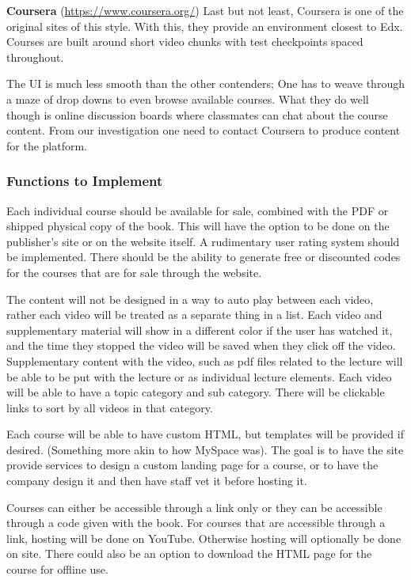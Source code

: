 \documentclass{article}
\begin{document}
\textbf{Coursera} (\url{https://www.coursera.org/})
Last but not least, Coursera is one of the original sites of this style. With
this, they provide an environment closest to Edx. Courses are built around short
video chunks with test checkpoints spaced throughout.

The UI is much less smooth than the other contenders; One has to weave through
a maze of drop downs to even browse available courses. What they do well though
is online discussion boards where classmates can chat about the course content.
From our investigation one need to contact Coursera to produce content for the
platform. \vspace{\baselineskip}

\subsubsection{Functions to Implement}

Each individual course should be available for sale, combined with the PDF or shipped physical copy of the book. This will have the option to be done on the publisher's site or on the website itself. A rudimentary user rating system should be implemented. There should be the ability to generate free or discounted codes for the courses that are for sale through the website.

The content will not be designed in a way to auto play between each video, rather each video will be treated as a separate thing in a list. Each video and supplementary material will show in a different color if the user has watched it, and the time they stopped the video will be saved when they click off the video. Supplementary content with the video, such as pdf files related to the lecture will be able to be put with the lecture or as individual lecture elements. Each video will be able to have a topic category and sub category. There will be clickable links to sort by all videos in that category.

Each course will be able to have custom HTML, but templates will be provided if desired. (Something more akin to how MySpace was). The goal is to have the site provide services to design a custom landing page for a course, or to have the company design it and then have staff vet it before hosting it.

Courses can either be accessible through a link only or they can be accessible through a code given with the book. For courses that are accessible through a link, hosting will be done on YouTube. Otherwise hosting will optionally be done on site. There could also be an option to download the HTML page for the course for offline use.
\end{document}

